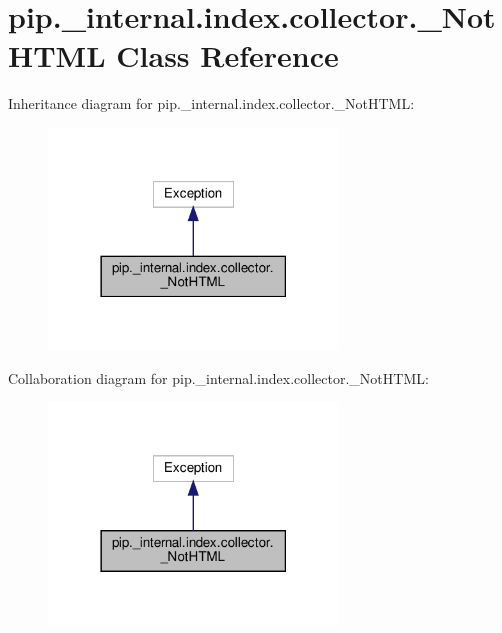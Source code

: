 \hypertarget{classpip_1_1__internal_1_1index_1_1collector_1_1__NotHTML}{}\section{pip.\+\_\+internal.\+index.\+collector.\+\_\+\+Not\+H\+T\+ML Class Reference}
\label{classpip_1_1__internal_1_1index_1_1collector_1_1__NotHTML}


Inheritance diagram for pip.\+\_\+internal.\+index.\+collector.\+\_\+\+Not\+H\+T\+ML\+:
\nopagebreak
\begin{figure}[H]
\begin{center}
\leavevmode
\includegraphics[width=218pt]{classpip_1_1__internal_1_1index_1_1collector_1_1__NotHTML__inherit__graph}
\end{center}
\end{figure}


Collaboration diagram for pip.\+\_\+internal.\+index.\+collector.\+\_\+\+Not\+H\+T\+ML\+:
\nopagebreak
\begin{figure}[H]
\begin{center}
\leavevmode
\includegraphics[width=218pt]{classpip_1_1__internal_1_1index_1_1collector_1_1__NotHTML__coll__graph}
\end{center}
\end{figure}
